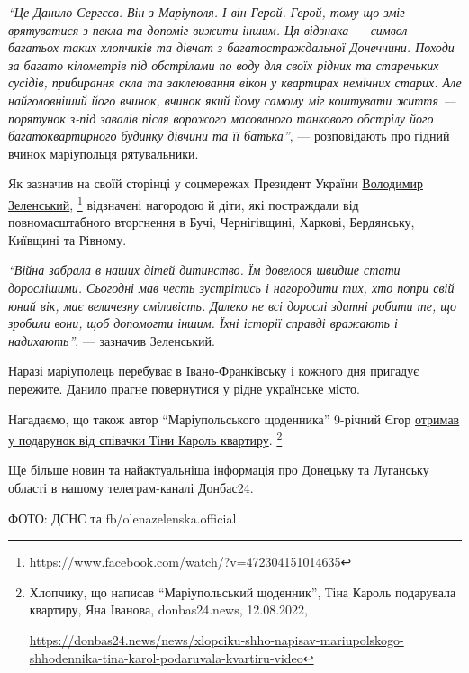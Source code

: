 \begin{leftbar}
\emph{\enquote{Це Данило Сергєєв. Він з Маріуполя. І він Герой. Герой, тому що зміг
врятуватися з пекла та допоміг вижити іншим. Ця відзнака — символ багатьох
таких хлопчиків та дівчат з багатостраждальної Донеччини. Походи за багато
кілометрів під обстрілами по воду для своїх рідних та стареньких сусідів,
прибирання скла та заклеювання вікон у квартирах немічних старих. Але
найголовніший його вчинок, вчинок який йому самому міг коштувати життя —
порятунок з-під завалів після ворожого масованого танкового обстрілу його
багатоквартирного будинку дівчини та її батька}}, — розповідають про гідний
вчинок маріупольця рятувальники.
\end{leftbar}


Як зазначив на своїй сторінці у соцмережах Президент України \href{https://www.facebook.com/watch/?v=472304151014635}{Володимир
Зеленський},%
\footnote{\url{https://www.facebook.com/watch/?v=472304151014635}} відзначені нагородою й діти, які постраждали від повномасштабного
вторгнення в Бучі, Чернігівщині, Харкові, Бердянську, Київщині та Рівному.

\begin{leftbar}
\emph{\enquote{Війна забрала в наших дітей дитинство. Їм довелося швидше стати дорослішими.
Сьогодні мав честь зустрітись і нагородити тих, хто попри свій юний вік, має
величезну сміливість. Далеко не всі дорослі здатні робити те, що зробили вони,
щоб допомогти іншим. Їхні історії справді вражають і надихають}}, — зазначив
Зеленський.
\end{leftbar}


Наразі маріуполець перебуває в Івано-Франківську і кожного дня пригадує
пережите. Данило прагне повернутися у рідне українське місто.

Нагадаємо, що також автор \enquote{Маріупольського щоденника} 9-річний Єгор \href{https://donbas24.news/news/xlopciku-shho-napisav-mariupolskogo-shhodennika-tina-karol-podaruvala-kvartiru-video}{отримав у
подарунок від співачки Тіни Кароль квартиру}.%
\footnote{Хлопчику, що написав \enquote{Маріупольський щоденник}, Тіна Кароль подарувала квартиру, Яна Іванова, donbas24.news, 12.08.2022, \par\url{https://donbas24.news/news/xlopciku-shho-napisav-mariupolskogo-shhodennika-tina-karol-podaruvala-kvartiru-video}}

Ще більше новин та найактуальніша інформація про Донецьку та Луганську області
в нашому телеграм-каналі Донбас24.

ФОТО: ДСНС та fb/olenazelenska.official

